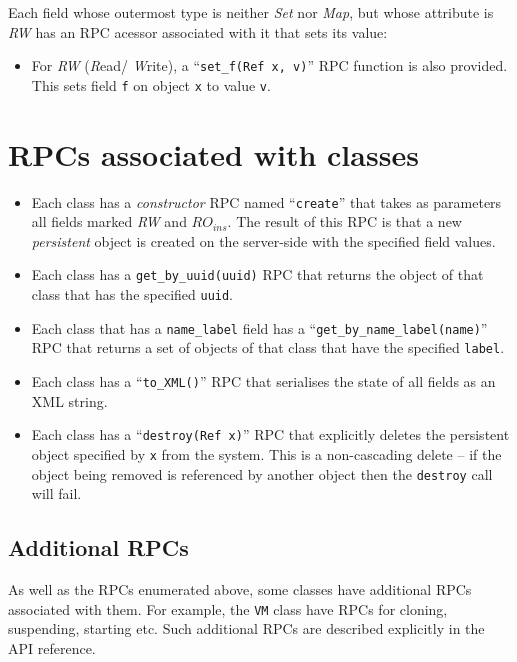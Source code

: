 Each field whose outermost type is neither {\em Set\/} nor {\em Map\/}, 
but whose attribute is {\em RW} has an RPC acessor associated with it
that sets its value:
\begin{itemize}
\item For {\em RW\/} ({\em R\/}ead/{\em
W\/}rite), a ``{\tt set\_f(Ref x, v)}'' RPC function is also provided.
This sets field {\tt f} on object {\tt x} to value {\tt v}.
\end{itemize}

\section{RPCs associated with classes}

\begin{itemize}
\item Each class has a {\em constructor\/} RPC named ``{\tt create}'' that
takes as parameters all fields marked {\em RW\/} and
$\mathit{RO}_\mathit{ins}$. The result of this RPC is that a new {\em
persistent\/} object is created on the server-side with the specified field
values.

\item Each class has a {\tt get\_by\_uuid(uuid)} RPC that returns the object
of that class that has the specified {\tt uuid}.

\item Each class that has a {\tt name\_label} field has a
``{\tt get\_by\_name\_label(name)}'' RPC that returns a set of objects of that
class that have the specified {\tt label}.

\item Each class has a ``{\tt to\_XML()}'' RPC that serialises the
state of all fields as an XML string.

\item Each class has a ``{\tt destroy(Ref x)}'' RPC that explicitly deletes
the persistent object specified by {\tt x} from the system.  This is a
non-cascading delete -- if the object being removed is referenced by another
object then the {\tt destroy} call will fail.

\end{itemize}

\subsection{Additional RPCs}

As well as the RPCs enumerated above, some classes have additional RPCs
associated with them. For example, the {\tt VM} class have RPCs for cloning,
suspending, starting etc. Such additional RPCs are described explicitly
in the API reference.
